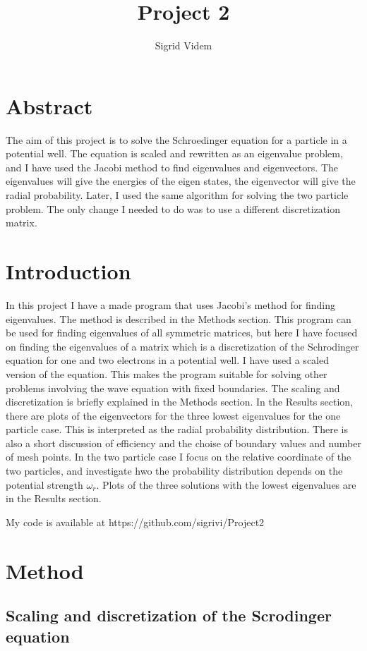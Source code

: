 \documentclass{article}
\author{Sigrid Videm}
\title{Project 2}
\begin{document}
\maketitle
\tableofcontents %

\section{Abstract} 
The aim of this project is to solve the Schroedinger equation for a particle in a potential well. The equation is scaled and rewritten as an eigenvalue problem, and I have used the Jacobi method to find eigenvalues and eigenvectors. The eigenvalues will give the energies of the eigen states, the eigenvector will give the radial probability. Later, I used the same algorithm for solving the two particle problem. The only change I needed to do was to use a different discretization matrix. 
\section{Introduction}
In this project I have a made program that uses Jacobi's method for finding eigenvalues. The method is described in the Methods section. This program can be used for finding eigenvalues of all symmetric matrices, but here I have focused on finding the eigenvalues of a matrix which is a discretization of the Schrodinger equation for one and two electrons in a potential well.  I have used a scaled version of the equation. This makes the program suitable for solving other problems involving the wave equation with fixed boundaries. The scaling and discretization is briefly explained in the Methods section. In the Results section, there are plots of the eigenvectors for the three lowest eigenvalues for the one particle case. This is interpreted as the radial probability distribution. There is also a short discussion of efficiency and the choise of boundary values and number of mesh points. In the two particle case I focus on the relative coordinate of the two particles, and investigate hwo the probability distribution depends on the potential strength $\omega_r$. Plots of the three solutions with the lowest eigenvalues are in the Results section.

My code is available at https://github.com/sigrivi/Project2

\section{Method}
\subsection{Scaling and discretization of the Scrodinger equation}
\end{document}
